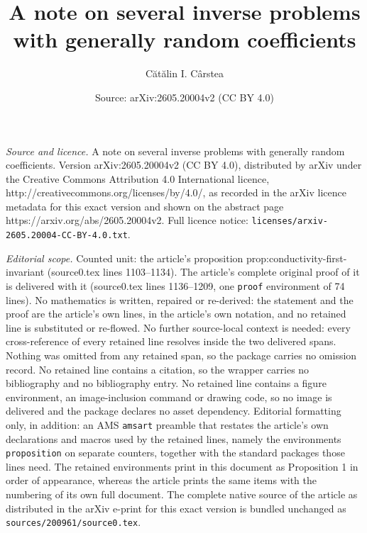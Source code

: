 \documentclass[10pt,a4paper]{amsart}
\title{A note on several inverse problems with generally random coefficients}
\author{C\u{a}t\u{a}lin I. C\^arstea}
\date{Source: arXiv:2605.20004v2 (CC BY 4.0)}
\begin{document}
\maketitle

\noindent\emph{Source and licence.} A note on several inverse problems with generally random coefficients. Version arXiv:2605.20004v2 (CC BY 4.0), distributed by arXiv under the Creative Commons Attribution 4.0 International licence, http://creativecommons.org/licenses/by/4.0/, as recorded in the arXiv licence metadata for this exact version and shown on the abstract page https://arxiv.org/abs/2605.20004v2. Full licence notice: \texttt{licenses/arxiv-2605.20004-CC-BY-4.0.txt}.\par\smallskip

\noindent\textit{Editorial scope.} Counted unit: the article's proposition prop:conductivity-first-invariant (source0.tex lines 1103--1134). The article's complete original proof of it is delivered with it (source0.tex lines 1136--1209, one \texttt{proof} environment of 74 lines). No mathematics is written, repaired or re-derived: the statement and the proof are the article's own lines, in the article's own notation, and no retained line is substituted or re-flowed.  No further source-local context is needed: every cross-reference of every retained line resolves inside the two delivered spans.  Nothing was omitted from any retained span, so the package carries no omission record.  No retained line contains a citation, so the wrapper carries no bibliography and no bibliography entry.  No retained line contains a figure environment, an image-inclusion command or drawing code, so no image is delivered and the package declares no asset dependency.  Editorial formatting only, in addition: an AMS \texttt{amsart} preamble that restates the article's own declarations and macros used by the retained lines, namely the environments \texttt{proposition} on separate counters, together with the standard packages those lines need.  The retained environments print in this document as Proposition 1 in order of appearance, whereas the article prints the same items with the numbering of its own full document.  The complete native source of the article as distributed in the arXiv e-print for this exact version is bundled unchanged as \texttt{sources/200961/source0.tex}.
\end{document}
